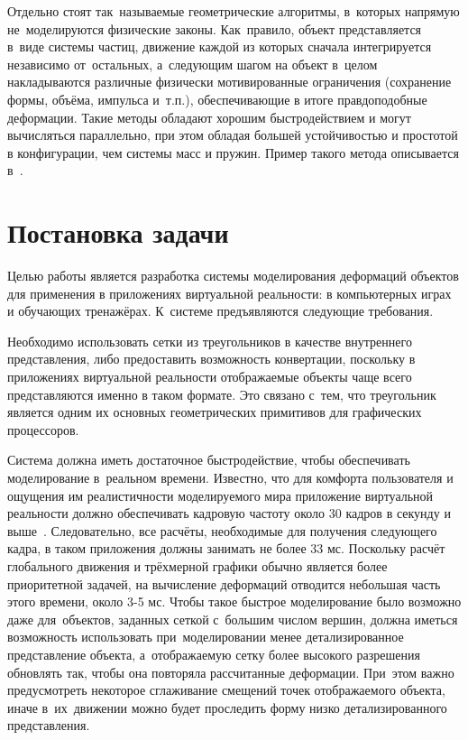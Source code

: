 \documentclass[a4paper, 14pt, titlepage]{extarticle}
\let\oldsection\section
\renewcommand{\section}{\newpage\oldsection}
\begin{document}
    Отдельно стоят так~называемые геометрические алгоритмы, в~которых напрямую не~моделируются
    физические законы. Как~правило, объект представляется в~виде системы частиц, движение каждой из
    которых сначала интегрируется независимо от~остальных, а~следующим шагом на объект в~целом
    накладываются различные физически мотивированные ограничения (сохранение формы, объёма, импульса
    и~т.п.), обеспечивающие в итоге правдоподобные деформации. Такие методы обладают хорошим
    быстродействием и могут вычисляться параллельно, при этом обладая большей устойчивостью и
    простотой в конфигурации, чем системы масс и пружин. Пример такого метода описывается в~\cite{mueller-meshless}.

  \section{Постановка задачи}\label{sec:task}

    Целью работы является разработка системы моделирования деформаций объектов для применения в
    приложениях виртуальной реальности: в компьютерных играх и обучающих тренажёрах.
    К~системе предъявляются следующие требования.

    Необходимо использовать сетки из треугольников в качестве внутреннего представления, либо
    предоставить возможность конвертации, поскольку в приложениях виртуальной реальности отображаемые объекты
    чаще всего представляются именно в таком формате. Это связано с~тем, что треугольник является
    одним их основных геометрических примитивов для графических процессоров.~\cite{nvidia-tutorial}

    Система должна иметь достаточное быстродействие, чтобы обеспечивать моделирование в~реальном
    времени. Известно, что для комфорта пользователя и ощущения им реалистичности моделируемого мира
    приложение виртуальной реальности должно обеспечивать кадровую частоту около 30 кадров в секунду %
    и выше~\cite{claypool-framerate}. Следовательно, все расчёты, необходимые для получения
    следующего кадра, в таком приложения должны занимать не более 33 мс. Поскольку расчёт глобального
    движения и трёхмерной графики обычно является более приоритетной задачей, на вычисление
    деформаций отводится небольшая часть этого времени, около 3-5 мс. Чтобы такое быстрое
    моделирование было возможно даже для~объектов, заданных сеткой с~большим числом вершин,
    должна иметься возможность использовать при~моделировании менее детализированное представление
    объекта, а~отображаемую сетку более высокого разрешения обновлять так, чтобы она повторяла
    рассчитанные деформации. При~этом важно предусмотреть некоторое сглаживание смещений точек
    отображаемого объекта, иначе в~их~движении можно будет проследить форму низко детализированного
    представления.
\end{document}
